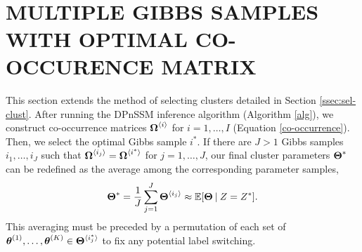 \documentclass[twoside]{article}
\begin{document}
\begin{algorithm}[H]
\begin{algorithmic}[1]
    \EndFor
   	 \EndFor
    \EndFor
    \EndFor \\
   \end{algorithmic}
\end{algorithm}

\section{MULTIPLE GIBBS SAMPLES WITH OPTIMAL CO-OCCURENCE MATRIX} \label{mult-co}
This section extends the method of selecting clusters detailed in Section \ref{ssec:sel-clust}.  After running the DPnSSM inference algorithm (Algorithm \ref{alg}), we construct co-occurrence matrices $\boldsymbol{\Omega}^{\langle i\rangle}_{}$  for $i = 1, \ldots, I$ (Equation \ref{co-occurrence}).  Then, we select the optimal Gibbs sample $i^*$.  If there are $J > 1$ Gibbs samples $i_1, \ldots, i_J$ such that $\boldsymbol{\Omega}^{\langle i_j\rangle}_{} = \boldsymbol{\Omega}^{\langle i^*\rangle}_{}$ for $j = 1, \ldots, J$, our final cluster parameters $\boldsymbol{\Theta}^*$ can be redefined as the average among the corresponding parameter samples,
\begin{align} \label{final-params}
\boldsymbol{\Theta}^* = \frac{1}{J} \sum_{j=1}^J \boldsymbol{\Theta}^{\langle i_j\rangle}_{} \approx \mathbb{E}[\boldsymbol{\Theta} \:\vert\: Z = Z^*].
\end{align}
This averaging must be preceded by a permutation of each set of $\boldsymbol{\theta}^{(1)}_{}, \ldots, \boldsymbol{\theta}^{(K)}_{} \in \boldsymbol{\Theta}^{\langle i_j^*\rangle}_{}$ to fix any potential label switching.     
\end{document}
